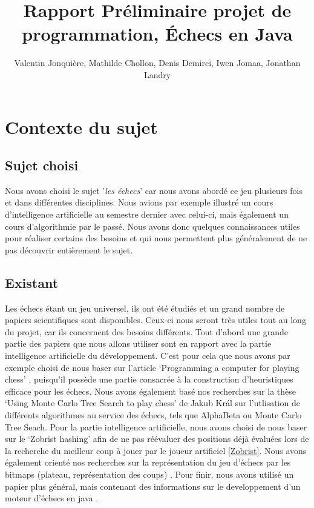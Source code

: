 \documentclass{article}
\author{
    Valentin Jonquière,
    Mathilde Chollon,
    Denis Demirci,
    Iwen Jomaa,
    Jonathan Landry
}
\title{Rapport Préliminaire projet de programmation, Échecs en Java}
\begin{document}
\maketitle

\pagebreak

\tableofcontents

\pagebreak

\section{Contexte du sujet}
\subsection{Sujet choisi}
Nous avons choisi le sujet '\textit{les échecs}' car nous avons abordé ce jeu
plusieurs fois et dans différentes disciplines. Nous avions par exemple illustré un 
cours d'intelligence artificielle au semestre dernier avec celui-ci, mais 
également un cours d'algorithmie par le passé. Nous avons donc quelques connaissances 
utiles pour réaliser certains des besoins et qui nous permettent plus généralement de ne pas
découvrir entièrement le sujet.

\subsection{Existant}
Les échecs étant un jeu universel, ils ont été étudiés et un grand nombre de papiers scientifiques
sont disponibles. Ceux-ci nous seront très utiles tout au long du projet, car ils concernent des
besoins différents. Tout d'abord une grande partie des papiers que nous allons utiliser sont en rapport
avec la partie intelligence artificielle du développement. C'est pour cela que nous avons par exemple
choisi de nous baser sur l'article `Programming a computer for playing chess' \cite{Shannon1950}, 
puisqu'il possède une partie consacrée à la construction d'heuristiques efficace pour les échecs.
Nous avons également basé nos recherches sur la thèse `Using Monte Carlo Tree Search to play chess' \cite{Kral2021}
de Jakub Král sur l'utlisation de différents algorithmes au service des échecs, tels que AlphaBeta ou
Monte Carlo Tree Seach. Pour la partie intelligence artificielle, nous avons choisi de nous baser sur le 
`Zobrist hashing' \cite{ZobristHashing} afin de ne pas réévaluer des positions déjà évaluées lors de la 
recherche du meilleur coup à jouer par le joueur artificiel \ref{Zobrist}. Nous avons également orienté
nos recherches sur la représentation du jeu d'échecs par les bitmaps (plateau, représentation des coups) \cite{Bijl2021}.
Pour finir, nous avons utilisé un papier plus général, mais contenant des informations sur le developpement
d'un moteur d'échecs en java \cite{PaulDailly}.
\end{document}
